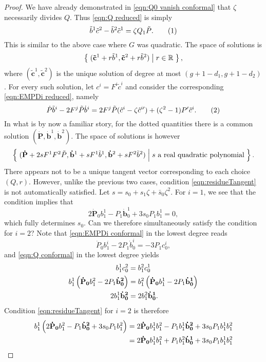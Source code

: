 \documentclass{article}
\begin{document}
\begin{lem}[Case (v)]
\begin{proof}
We have already demonstrated in \eqref{eqn:Q0 vanish conformal} that $\zeta$ necessarily divides $Q$. Thus \eqref{eqn:Q reduced} is simply
\[
\tilde{b}^1 \tilde{c}^2 - \tilde{b}^2 \tilde{c}^1 = \zeta Q_1\tilde{P}.
\labelthis{eqn:Q conformal}
\]
This is similar to the above case where $G$ was quadratic. The space of solutions is
\[
\left\{\;  (\mathbf{\tilde{c}}^1 + r \tilde{b}^1, \mathbf{\tilde{c}}^2 + r \tilde{b}^2)  \;\middle|\;  r\in \mathbb{R}  \;\right\},
\]
where $(\mathbf{\tilde{c}}^1,\mathbf{\tilde{c}}^2)$ is the unique solution of degree at most $(g+1-d_1, g+1-d_2)$. For every such solution, let $c^i = F^i\tilde{c}^i$ and consider the corresponding \eqref{eqn:EMPDi reduced}, namely
\[
\dot{P} \tilde{b}^i - 2 F^j \tilde{P} \dot{b}^i = 2 F^j \tilde{P} (\hat{c}^i - \zeta\hat{c}^{i\prime}) + (\zeta^2-1)P' \tilde{c}^i.
\labelthis{eqn:EMPDi conformal}
\]
In what is by now a familiar story, for the dotted quantities there is a common solution $(\mathbf{\dot{P}}, \mathbf{\dot{b}}^1, \mathbf{\dot{b}}^2)$. The space of solutions is however
\[
\left\{\; 
(\mathbf{\dot P} + 2s F^1F^2\tilde{P}, \mathbf{\dot b}^1 + s F^1\tilde{b}^1, \mathbf{\dot b}^2 + s F^2\tilde{b}^2)
 \;\middle|\;  s \text{ a real quadratic polynomial}  \;\right\}.
\]
There appears not to be a unique tangent vector corresponding to each choice $(Q,r)$. However, unlike the previous two cases, condition \eqref{eqn:residueTangent} is not automatically satisfied. Let $s = s_0 + s_1\zeta + \bar{s}_0 \zeta^2$. For $i=1$, we see that the condition implies that
\[
2 \mathbf{\dot{P}}_0 b^1_1 - P_1 \mathbf{\dot{b}}^1_0 + 3 s_0 P_1 b^1_1 = 0,
\]
which fully determines $s_0$. Can we therefore simultaneously satisfy the condition for $i=2$? Note that \eqref{eqn:EMPDi conformal} in the lowest degree reads
\[
\dot{P}_0 b^i_1 - 2P_1\dot{b}^i_0 = -3 P_1 c^i_0,
\]
and \eqref{eqn:Q conformal} in the lowest degree yields
\begin{align*}
b^1_1 c^2_0 &= b^2_1 c^1_0 \\
b^1_1 \left(\mathbf{\dot{P}_0} b^2_1 - 2P_1\mathbf{\dot{b}^2_0}\right) &= b^2_1 \left(\mathbf{\dot{P}_0} b^1_1 - 2P_1\mathbf{\dot{b}^1_0}\right) \\
2b^1_1 \mathbf{\dot{b}^2_0} &= 2 b^2_1 \mathbf{\dot{b}^1_0}.
\end{align*}
Condition \eqref{eqn:residueTangent} for $i=2$ is therefore
\begin{align*}
b^1_1 \bra{2 \mathbf{\dot{P}_0} b^2_1 - P_1 \mathbf{\dot{b}^2_0} + 3 s_0 P_1 b^2_1}
&= 2 \mathbf{\dot{P}_0} b^1_1b^2_1 - P_1 b^1_1\mathbf{\dot{b}^2_0} + 3 s_0 P_1 b^1_1b^2_1 \\
&= 2 \mathbf{\dot{P}_0} b^1_1b^2_1 + P_1 b^2_1 \mathbf{\dot{b}^1_0} + 3 s_0 P_1 b^1_1b^2_1 \\

\end{align*}
\end{proof}
\end{lem}
\end{document}

